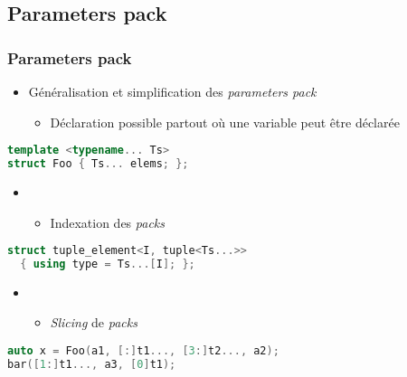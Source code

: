 \documentclass[C++.tex]{subfiles}
\begin{document}
\subsection*{Parameters pack}
\begin{frame}[fragile]
	\frametitle{Parameters pack}
	\begin{itemize}
		\item Généralisation et simplification des \textit{parameters pack}
		\begin{itemize}
			\item Déclaration possible partout où une variable peut être déclarée
		\end{itemize}
	\end{itemize}

	\begin{lstlisting}[language=C++]
template <typename... Ts>
struct Foo { Ts... elems; };\end{lstlisting}

	\begin{itemize}
		\item [] 
		\begin{itemize}
			\item Indexation des \textit{packs}
		\end{itemize}
	\end{itemize}

	\begin{lstlisting}[language=C++]
struct tuple_element<I, tuple<Ts...>>
  { using type = Ts...[I]; };\end{lstlisting}

	\begin{itemize}
		\item [] 
		\begin{itemize}
			\item \textit{Slicing} de \textit{packs}
		\end{itemize}
	\end{itemize}

	\begin{lstlisting}[language=C++]
auto x = Foo(a1, [:]t1..., [3:]t2..., a2);
bar([1:]t1..., a3, [0]t1);\end{lstlisting}
\end{frame}
\end{document}
